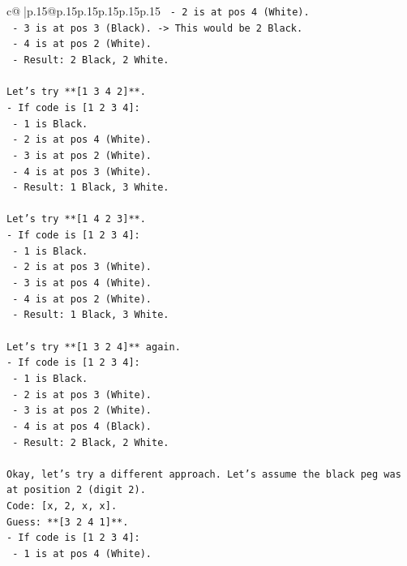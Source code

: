 \documentclass{article}
\begin{document}
{\begin{supertabular}{c@{$\;$}|p{.15\linewidth}@{}p{.15\linewidth}p{.15\linewidth}p{.15\linewidth}p{.15\linewidth}p{.15\linewidth}}
{{{\texttt{  {-} 2 is at pos 4 (White).} \\
\texttt{  {-} 3 is at pos 3 (Black). {-}> This would be 2 Black.} \\
\texttt{  {-} 4 is at pos 2 (White).} \\
\texttt{  {-} Result: 2 Black, 2 White.} \\
\\ 
\texttt{Let's try **{[}1 3 4 2{]}**.} \\
\texttt{{-} If code is {[}1 2 3 4{]}:} \\
\texttt{  {-} 1 is Black.} \\
\texttt{  {-} 2 is at pos 4 (White).} \\
\texttt{  {-} 3 is at pos 2 (White).} \\
\texttt{  {-} 4 is at pos 3 (White).} \\
\texttt{  {-} Result: 1 Black, 3 White.} \\
\\ 
\texttt{Let's try **{[}1 4 2 3{]}**.} \\
\texttt{{-} If code is {[}1 2 3 4{]}:} \\
\texttt{  {-} 1 is Black.} \\
\texttt{  {-} 2 is at pos 3 (White).} \\
\texttt{  {-} 3 is at pos 4 (White).} \\
\texttt{  {-} 4 is at pos 2 (White).} \\
\texttt{  {-} Result: 1 Black, 3 White.} \\
\\ 
\texttt{Let's try **{[}1 3 2 4{]}** again.} \\
\texttt{{-} If code is {[}1 2 3 4{]}:} \\
\texttt{  {-} 1 is Black.} \\
\texttt{  {-} 2 is at pos 3 (White).} \\
\texttt{  {-} 3 is at pos 2 (White).} \\
\texttt{  {-} 4 is at pos 4 (Black).} \\
\texttt{  {-} Result: 2 Black, 2 White.} \\
\\ 
\texttt{Okay, let's try a different approach. Let's assume the black peg was at position 2 (digit 2).} \\
\texttt{Code: {[}x, 2, x, x{]}.} \\
\texttt{Guess: **{[}3 2 4 1{]}**.} \\
\texttt{{-} If code is {[}1 2 3 4{]}:} \\
\texttt{  {-} 1 is at pos 4 (White).} \\
}}}
\end{supertabular}}
\end{document}
